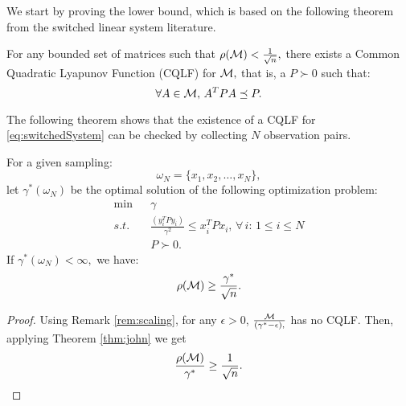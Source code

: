 We start by proving the lower bound, which is based on the following theorem from the switched linear system literature.

\begin{theorem}\cite[Theorem 2.11]{jungers_lncis}\label{thm:john}
For any bounded set of matrices such that $\rho(\mathcal{M})<\frac{1}{\sqrt{n}},$ there exists a Common Quadratic Lyapunov Function (CQLF) for $\mathcal{M},$ that is, a $P\succ 0$ such that: $$\forall A\in \mathcal{M},\, A^TPA\preceq P. $$
\end{theorem}

The following theorem shows that the existence of a CQLF for \eqref{eq:switchedSystem} can be checked by collecting $N$ observation pairs.
%
%


\begin{theorem}
For a given sampling: $$\omega_N = \{x_1, x_2, \ldots, x_N\},$$ let $\gamma^*(\omega_N)$ be the optimal solution of the following optimization problem:
\begin{eqnarray}
\nonumber \mbox{min}&&\gamma\\
 s.t.& & \label{eq:lowerbound}\frac{(y_i^T P y_i)}{\gamma^2} \leq x_i^TPx_i,\,  \forall \,i : \,1\leq i \leq N\\
\nonumber && P \succ 0.
\end{eqnarray}
If $\gamma^*(\omega_N)<\infty,$ we have:
$$\rho(\mathcal{M}) \geq \frac{\gamma^*}{\sqrt{n}}.$$

\end{theorem}
\begin{proof}
Using Remark \ref{rem:scaling}, for any $\epsilon > 0$, $\frac{\mathcal{M}}{(\gamma^*-\epsilon),}$ has no CQLF. Then, applying Theorem \ref{thm:john} we get
\begin{equation*}\frac{\rho(\mathcal{M})}{\gamma^*} \geq \frac{1}{\sqrt{n}}.\end{equation*}
\end{proof}